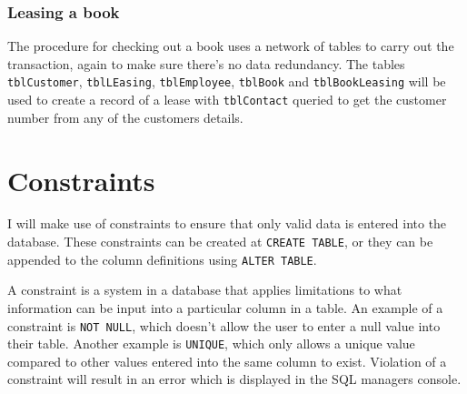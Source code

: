 \documentclass[11pt,a4paper]{scrartcl}
\begin{document}
	\subsubsection*{Leasing a book}
	
	The procedure for checking out a book uses a network of tables to carry out the transaction, again to make sure there's no data redundancy. The tables \texttt{tblCustomer}, \texttt{tblLEasing}, \texttt{tblEmployee}, \texttt{tblBook} and \texttt{tblBookLeasing} will be used to create a record of a lease with \texttt{tblContact} queried to get the customer number from any of the customers details.
	
	\section{Constraints}
	
	I will make use of constraints to ensure that only valid data is entered into the database. These constraints can be created at \texttt{CREATE TABLE}, or they can be appended to the column definitions using \texttt{ALTER TABLE}.
	
	A constraint is a system in a database that applies limitations to what information can be input into a particular column in a table. An example of a constraint is \texttt{NOT NULL}, which doesn't allow the user to enter a null value into their table. Another example is \texttt{UNIQUE}, which only allows a unique value compared to other values entered into the same column to exist. Violation of a constraint will result in an error which is displayed in the SQL managers console.
	
	
\end{document}
